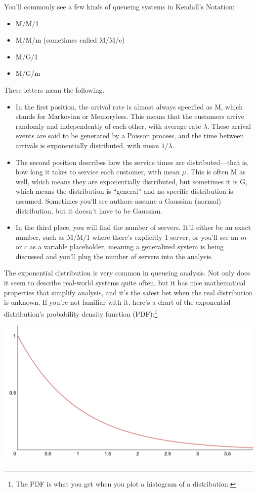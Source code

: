 \documentclass{vivid_layout_pdf}
\begin{document}
You'll commonly see a few kinds of queueing systems in Kendall's Notation:

\begin{itemize}
\item M/M/1
\item M/M/m (sometimes called M/M/c)
\item M/G/1
\item M/G/m
\end{itemize}

These letters mean the following.

\begin{itemize}
\item In the first position, the arrival rate is almost always specified as M, which stands for Markovian or Memoryless. This means that the customers arrive randomly and independently of each other, with average rate \( \lambda \). These arrival events are said to be generated by a Poisson process, and the time between arrivals is exponentially distributed, with mean \( 1/\lambda \).
\item The second position describes how the service times are distributed---that is, how long it takes to service each customer, with mean \( \mu \). This is often M as well, which means they are exponentially distributed, but sometimes it is G, which means the distribution is ``general'' and no specific distribution is assumed. Sometimes you'll see authors assume a Gaussian (normal) distribution, but it doesn't have to be Gaussian.
\item In the third place, you will find the number of servers. It'll either be an exact number, such as M/M/1 where there's explicitly 1 server, or you'll see an $m$ or $c$ as a variable placeholder, meaning a generalized system is being discussed and you'll plug the number of servers into the analysis.
\end{itemize}

The exponential distribution is very common in queueing analysis. Not only does it seem to describe real-world systems quite often, but it has nice mathematical properties that simplify analysis, and it's the safest bet when the real distribution is unknown. If you're not familiar with it, here's a chart of the exponential distribution's probability density function (PDF):\footnote{The PDF is what you get when you plot a histogram of a distribution.}

\begin{center}
\includegraphics[width=.75\linewidth]{queueing-theory/exp}
\end{center}
\end{document}
